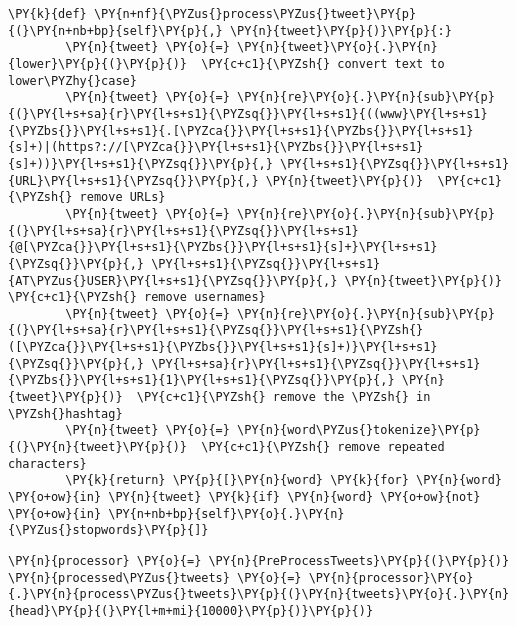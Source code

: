 \documentclass[11pt]{article}
\begin{document}
\begin{tcolorbox}[breakable, size=fbox, boxrule=1pt, pad at break*=1mm,colback=cellbackground, colframe=cellborder]
\begin{Verbatim}[commandchars=\\\{\}]
    \PY{k}{def} \PY{n+nf}{\PYZus{}process\PYZus{}tweet}\PY{p}{(}\PY{n+nb+bp}{self}\PY{p}{,} \PY{n}{tweet}\PY{p}{)}\PY{p}{:}
        \PY{n}{tweet} \PY{o}{=} \PY{n}{tweet}\PY{o}{.}\PY{n}{lower}\PY{p}{(}\PY{p}{)}  \PY{c+c1}{\PYZsh{} convert text to lower\PYZhy{}case}
        \PY{n}{tweet} \PY{o}{=} \PY{n}{re}\PY{o}{.}\PY{n}{sub}\PY{p}{(}\PY{l+s+sa}{r}\PY{l+s+s1}{\PYZsq{}}\PY{l+s+s1}{((www}\PY{l+s+s1}{\PYZbs{}}\PY{l+s+s1}{.[\PYZca{}}\PY{l+s+s1}{\PYZbs{}}\PY{l+s+s1}{s]+)|(https?://[\PYZca{}}\PY{l+s+s1}{\PYZbs{}}\PY{l+s+s1}{s]+))}\PY{l+s+s1}{\PYZsq{}}\PY{p}{,} \PY{l+s+s1}{\PYZsq{}}\PY{l+s+s1}{URL}\PY{l+s+s1}{\PYZsq{}}\PY{p}{,} \PY{n}{tweet}\PY{p}{)}  \PY{c+c1}{\PYZsh{} remove URLs}
        \PY{n}{tweet} \PY{o}{=} \PY{n}{re}\PY{o}{.}\PY{n}{sub}\PY{p}{(}\PY{l+s+sa}{r}\PY{l+s+s1}{\PYZsq{}}\PY{l+s+s1}{@[\PYZca{}}\PY{l+s+s1}{\PYZbs{}}\PY{l+s+s1}{s]+}\PY{l+s+s1}{\PYZsq{}}\PY{p}{,} \PY{l+s+s1}{\PYZsq{}}\PY{l+s+s1}{AT\PYZus{}USER}\PY{l+s+s1}{\PYZsq{}}\PY{p}{,} \PY{n}{tweet}\PY{p}{)}  \PY{c+c1}{\PYZsh{} remove usernames}
        \PY{n}{tweet} \PY{o}{=} \PY{n}{re}\PY{o}{.}\PY{n}{sub}\PY{p}{(}\PY{l+s+sa}{r}\PY{l+s+s1}{\PYZsq{}}\PY{l+s+s1}{\PYZsh{}([\PYZca{}}\PY{l+s+s1}{\PYZbs{}}\PY{l+s+s1}{s]+)}\PY{l+s+s1}{\PYZsq{}}\PY{p}{,} \PY{l+s+sa}{r}\PY{l+s+s1}{\PYZsq{}}\PY{l+s+s1}{\PYZbs{}}\PY{l+s+s1}{1}\PY{l+s+s1}{\PYZsq{}}\PY{p}{,} \PY{n}{tweet}\PY{p}{)}  \PY{c+c1}{\PYZsh{} remove the \PYZsh{} in \PYZsh{}hashtag}
        \PY{n}{tweet} \PY{o}{=} \PY{n}{word\PYZus{}tokenize}\PY{p}{(}\PY{n}{tweet}\PY{p}{)}  \PY{c+c1}{\PYZsh{} remove repeated characters}
        \PY{k}{return} \PY{p}{[}\PY{n}{word} \PY{k}{for} \PY{n}{word} \PY{o+ow}{in} \PY{n}{tweet} \PY{k}{if} \PY{n}{word} \PY{o+ow}{not} \PY{o+ow}{in} \PY{n+nb+bp}{self}\PY{o}{.}\PY{n}{\PYZus{}stopwords}\PY{p}{]}
\end{Verbatim}
\end{tcolorbox}

    \begin{tcolorbox}[breakable, size=fbox, boxrule=1pt, pad at break*=1mm,colback=cellbackground, colframe=cellborder]
\begin{Verbatim}[commandchars=\\\{\}]
\PY{n}{processor} \PY{o}{=} \PY{n}{PreProcessTweets}\PY{p}{(}\PY{p}{)}
\PY{n}{processed\PYZus{}tweets} \PY{o}{=} \PY{n}{processor}\PY{o}{.}\PY{n}{process\PYZus{}tweets}\PY{p}{(}\PY{n}{tweets}\PY{o}{.}\PY{n}{head}\PY{p}{(}\PY{l+m+mi}{10000}\PY{p}{)}\PY{p}{)}
\end{Verbatim}
\end{tcolorbox}
\end{document}
